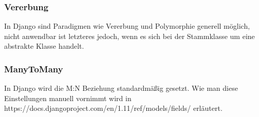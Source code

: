 \documentclass[a4paper,11pt]{article}
\begin{document}
\subsubsection*{Vererbung}
In Django sind Paradigmen wie Vererbung und Polymorphie generell möglich,
nicht anwendbar ist letzteres jedoch, wenn es sich bei der Stammklasse um eine abstrakte Klasse handelt.

\subsubsection*{ManyToMany}
In Django wird die M:N Beziehung standardmäßig gesetzt. Wie man diese Einstellungen manuell vornimmt wird in https://docs.djangoproject.com/en/1.11/ref/models/fields/ erläutert.
\end{document}
